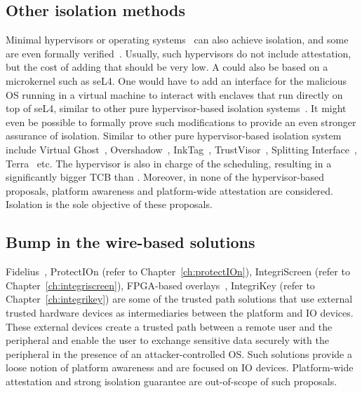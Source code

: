 \subsection{Other isolation methods} 

Minimal hypervisors or operating systems~\cite{herder2006minix,klein2009sel4} can also achieve isolation, and some are even formally verified~\cite{klein2009sel4}. Usually, such hypervisors do not include attestation, but the cost of adding that should be very low. A \name{} could also be based on a microkernel such as seL4. One would have to add an interface for the malicious OS running in a virtual machine to interact with enclaves that run directly on top of seL4, similar to other pure hypervisor-based isolation systems~\cite{virtualGhost,Overshadow,InkTag,TrustVisor,SplittingInterfaces,terra}. It might even be possible to formally prove such modifications to provide an even stronger assurance of isolation. Similar to other pure hypervisor-based isolation system include Virtual Ghost~\cite{virtualGhost}, Overshadow~\cite{Overshadow}, InkTag~\cite{InkTag}, TrustVisor~\cite{TrustVisor}, Splitting Interface~\cite{SplittingInterfaces}, Terra~\cite{terra} etc.  The hypervisor is also in charge of the scheduling, resulting in a significantly bigger TCB than \name. Moreover, in none of the hypervisor-based proposals, platform awareness and platform-wide attestation are considered. Isolation is the sole objective of these proposals.

\subsection{Bump in the wire-based solutions} 

Fidelius~\cite{Fidelius}, ProtectIOn (refer to Chapter~\ref{ch:protectIOn}), IntegriScreen (refer to Chapter~\ref{ch:integriscreen}), FPGA-based overlays~\cite{fpga_overlay}, IntegriKey (refer to Chapter~\ref{ch:integrikey}) are some of the trusted path solutions that use external trusted hardware devices as intermediaries between the platform and IO devices. These external devices create a trusted path between a remote user and the peripheral and enable the user to exchange sensitive data securely with the peripheral in the presence of an attacker-controlled OS. Such solutions provide a loose notion of platform awareness and are focused on IO devices. Platform-wide attestation and strong isolation guarantee are out-of-scope of such proposals. 



%     

